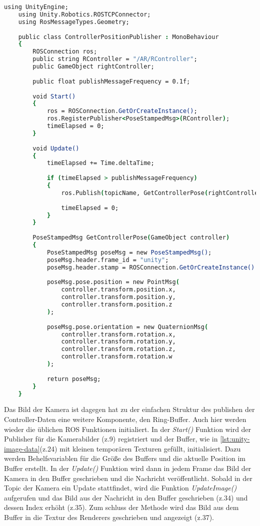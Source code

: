\begin{lstlisting}[language=csh, caption=Abgreifen der Controller Daten, label=lst:unity-controller-data]
    using UnityEngine;
    using Unity.Robotics.ROSTCPConnector;
    using RosMessageTypes.Geometry;
    
    public class ControllerPositionPublisher : MonoBehaviour
    {
        ROSConnection ros;
        public string RController = "/AR/RController";
        public GameObject rightController;
        
        public float publishMessageFrequency = 0.1f;
    
        void Start()
        {
            ros = ROSConnection.GetOrCreateInstance();
            ros.RegisterPublisher<PoseStampedMsg>(RController);
            timeElapsed = 0;
        }
    
        void Update()
        {
            timeElapsed += Time.deltaTime;
    
            if (timeElapsed > publishMessageFrequency)
            {
                ros.Publish(topicName, GetControllerPose(rightController));
    
                timeElapsed = 0;
            }
        }
    
        PoseStampedMsg GetControllerPose(GameObject controller)
        {
            PoseStampedMsg poseMsg = new PoseStampedMsg();
            poseMsg.header.frame_id = "unity";
            poseMsg.header.stamp = ROSConnection.GetOrCreateInstance().GetROSTime();
            
            poseMsg.pose.position = new PointMsg(
                controller.transform.position.x,
                controller.transform.position.y,
                controller.transform.position.z
            );
            
            poseMsg.pose.orientation = new QuaternionMsg(
                controller.transform.rotation.x,
                controller.transform.rotation.y,
                controller.transform.rotation.z,
                controller.transform.rotation.w
            );
    
            return poseMsg;
        }
    }
\end{lstlisting}
Das Bild der Kamera ist dagegen hat zu der einfachen Struktur des publishen der Controller-Daten eine weitere Komponente, den Ring-Buffer. Auch hier werden wieder die üblichen \ac{ROS} Funktionen initialiert. In der \textit{Start()} Funktion wird der Publisher für die Kamerabilder (z.9) registriert und der Buffer, wie in \autoref{lst:unity-image-data}(z.24) mit kleinen temporären Texturen gefüllt, initialisiert. Dazu werden Behelfsvariablen für die Größe des Buffers und die aktuelle Position im Buffer erstellt. In der \textit{Update()} Funktion wird dann in jedem Frame das Bild der Kamera in den Buffer geschrieben und die Nachricht veröffentlicht. Sobald in der Topic der Kamera ein Update stattfindet, wird die Funktion \textit{UpdateImage()} aufgerufen und das Bild aus der Nachricht in den Buffer geschrieben (z.34) und dessen Index erhöht (z.35). Zum schluss der Methode wird das Bild aus dem Buffer in die Textur des Renderers geschrieben und angezeigt (z.37).\\
